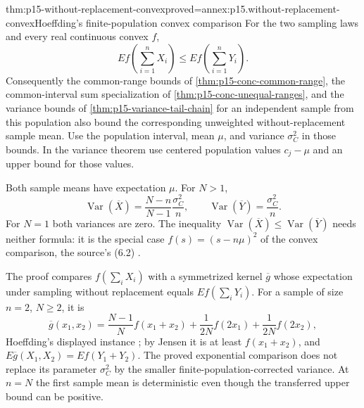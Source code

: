 \begin{hbtheorem}{thm:p15-without-replacement-convex}{proved=annex:p15.without-replacement-convex}{Hoeffding's finite-population convex comparison}
For the two sampling laws and every real continuous convex \(f\),
\[
 E f\!\left(\sum_{i=1}^nX_i\right)
 \leq E f\!\left(\sum_{i=1}^nY_i\right).
\]
Consequently the common-range bounds of
\cref{thm:p15-conc-common-range}, the common-interval sum specialization of
\cref{thm:p15-conc-unequal-ranges}, and the variance bounds of
\cref{thm:p15-variance-tail-chain} for an independent sample from this
population also bound the corresponding unweighted without-replacement
sample mean.
Use the population interval, mean \(\mu\), and variance \(\sigma_C^2\)
in those bounds. In the variance theorem use centered population values
\(c_j-\mu\) and an upper bound for those values.

Both sample means have expectation \(\mu\). For \(N>1\),
\[
 \operatorname{Var}(\overline X)
 =\frac{N-n}{N-1}\frac{\sigma_C^2}{n},\qquad
 \operatorname{Var}(\overline Y)=\frac{\sigma_C^2}{n}.
\]
For \(N=1\) both variances are zero. The inequality
\(\operatorname{Var}(\overline X)\leq\operatorname{Var}(\overline Y)\)
needs neither formula: it is the special case
\(f(s)=(s-n\mu)^2\) of the convex comparison, the source's (6.2)
\cite[p.~28]{Hoeffding1963BoundedSums}.

The proof compares \(f(\sum_iX_i)\) with a symmetrized kernel
\(\overline g\) whose expectation under sampling without replacement
equals \(Ef(\sum_iY_i)\). For a sample of size \(n=2\), \(N\geq2\), it is
\[
 \overline g(x_1,x_2)=\frac{N-1}Nf(x_1+x_2)
 +\frac1{2N}f(2x_1)+\frac1{2N}f(2x_2),
\]
Hoeffding's displayed instance \cite[p.~29]{Hoeffding1963BoundedSums};
by Jensen it is at least \(f(x_1+x_2)\), and
\(E\overline g(X_1,X_2)=Ef(Y_1+Y_2)\).
The proved exponential comparison
does not replace its parameter \(\sigma_C^2\) by the smaller
finite-population-corrected variance. At \(n=N\) the first sample mean is
deterministic even though the transferred upper bound can be positive.
\end{hbtheorem}

